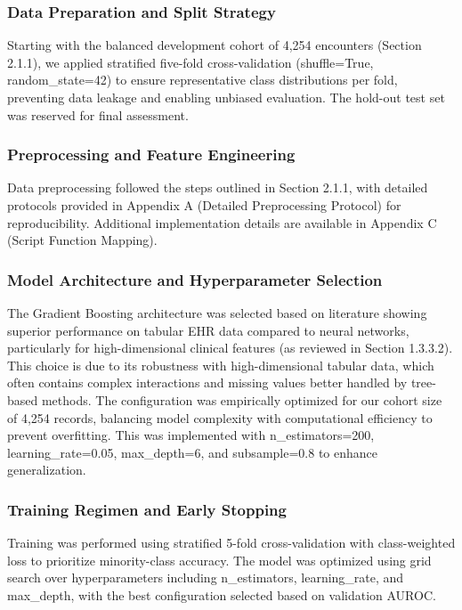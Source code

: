 \documentclass[12pt, a4paper]{article}
\begin{document}
\subsubsection{Data Preparation and Split Strategy}
Starting with the balanced development cohort of 4,254 encounters (Section 2.1.1), we applied stratified five-fold cross-validation (shuffle=True, random\_state=42) to ensure representative class distributions per fold, preventing data leakage and enabling unbiased evaluation. The hold-out test set was reserved for final assessment.

\subsubsection{Preprocessing and Feature Engineering}
Data preprocessing followed the steps outlined in Section 2.1.1, with detailed protocols provided in Appendix A (Detailed Preprocessing Protocol) for reproducibility. Additional implementation details are available in Appendix C (Script Function Mapping).

\subsubsection{Model Architecture and Hyperparameter Selection}
The Gradient Boosting architecture was selected based on literature showing superior performance on tabular EHR data compared to neural networks, particularly for high-dimensional clinical features (as reviewed in Section 1.3.3.2). This choice is due to its robustness with high-dimensional tabular data, which often contains complex interactions and missing values better handled by tree-based methods. The configuration was empirically optimized for our cohort size of 4,254 records, balancing model complexity with computational efficiency to prevent overfitting. This was implemented with n\_estimators=200, learning\_rate=0.05, max\_depth=6, and subsample=0.8 to enhance generalization.

\subsubsection{Training Regimen and Early Stopping}
Training was performed using stratified 5-fold cross-validation with class-weighted loss to prioritize minority-class accuracy. The model was optimized using grid search over hyperparameters including n\_estimators, learning\_rate, and max\_depth, with the best configuration selected based on validation AUROC.
\end{document}
